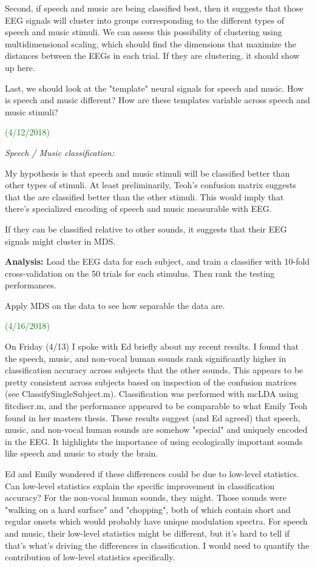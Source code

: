 \documentclass[11pt]{article}
\begin{document}
Second, if speech and music are being classified best, then it suggests that those EEG signals will cluster into groups corresponding to the different types of speech and music stimuli.  We can assess this possibility of clustering using multidimensional scaling, which should find the dimensions that maximize the distances between the EEGs in each trial.  If they are clustering, it should show up here.

Last, we should look at the "template" neural signals for speech and music.  How is speech and music different?  How are these templates variable across speech and music stimuli?

\textcolor{green}{(4/12/2018)}

\textit{Speech / Music classification:}

My hypothesis is that speech and music stimuli will be classified better than other types of stimuli.  At least preliminarily, Teoh's confusion matrix suggests that the are classified better than the other stimuli.  This would imply that there's specialized encoding of speech and music measurable with EEG.

If they can be classified relative to other sounds, it suggests that their EEG signals might cluster in MDS.

\textbf{Analysis:} Load the EEG data for each subject, and train a classifier with 10-fold cross-validation on the 50 trials for each stimulus.  Then rank the testing performances.

Apply MDS on the data to see how separable the data are.

\textcolor{green}{(4/16/2018)}

On Friday (4/13) I spoke with Ed briefly about my recent results.  I found that the speech, music, and non-vocal human sounds rank significantly higher in classification accuracy across subjects that the other sounds.  This appears to be pretty consistent across subjects based on inspection of the confusion matrices (see ClassifySingleSubject.m).  Classification was performed with mcLDA using fitcdiscr.m, and the performance appeared to be comparable to what Emily Teoh found in her masters thesis.  These results suggest (and Ed agreed) that speech, music, and non-vocal human sounds are somehow "special" and uniquely encoded in the EEG.  It highlights the importance of using ecologically important sounds like speech and music to study the brain.

Ed and Emily wondered if these differences could be due to low-level statistics.  Can low-level statistics explain the specific improvement in classification accuracy?  For the non-vocal human sounds, they might.  Those sounds were "walking on a hard surface" and "chopping", both of which contain short and regular onsets which would probably have unique modulation spectra.  For speech and music, their low-level statistics might be different, but it's hard to tell if that's what's driving the differences in classification.  I would need to quantify the contribution of low-level statistics specifically.
\end{document}
